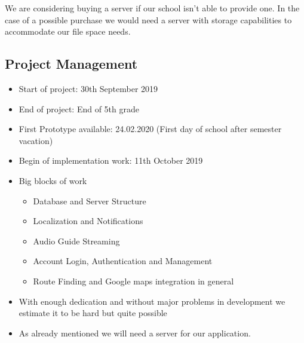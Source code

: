 \documentclass[12pt]{article}
\theoremstyle{definition}
\begin{document}
We are considering buying a server if our school isn't able to provide one. In the case of a possible purchase we would need a server with storage capabilities to accommodate our file space needs.

\subsection{Project Management}
\begin{itemize}
    \item Start of project: 30th September 2019
    \item End of project: End of 5th grade
    \newline
    \item First Prototype available: 24.02.2020 (First day of school after semester vacation)
    \item Begin of implementation work: 11th October 2019
    \newline
    \newline
    \item Big blocks of work
    \begin{itemize}
        \item Database and Server Structure
        \item Localization and Notifications
        \item Audio Guide Streaming
        \item Account Login, Authentication and Management
        \item Route Finding and Google maps integration in general
    \end{itemize}
    \item With enough dedication and without major problems in development we estimate it to be hard but quite possible
    \item As already mentioned we will need a server for our application.
    
\end{itemize} 
\end{document}
